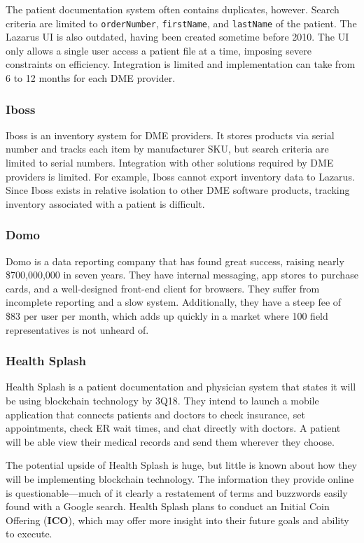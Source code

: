 \documentclass[letterpaper]{article}
\begin{document}
  The patient documentation system often contains duplicates, however. Search criteria are limited to \texttt{orderNumber}, \texttt{firstName}, and \texttt{lastName} of the patient. The Lazarus UI is also outdated, having been created sometime before 2010. The UI only allows a single user access a patient file at a time, imposing severe constraints on efficiency. Integration is limited and implementation can take from 6 to 12 months for each DME provider.%

  \subsubsection{Iboss}
  Iboss is an inventory system for DME providers. It stores products via serial number and tracks each item by manufacturer SKU, but search criteria are limited to serial numbers. Integration with other solutions required by DME providers is limited. For example, Iboss cannot export inventory data to Lazarus. Since Iboss exists in relative isolation to other DME software products, tracking inventory associated with a patient is difficult.%

  \subsubsection{Domo}
  Domo is a data reporting company that has found great success, raising nearly \$700,000,000 in seven years. They have internal messaging, app stores to purchase cards, and a well-designed front-end client for browsers. They suffer from incomplete reporting and a slow system. Additionally, they have a steep fee of \$83 per user per month, which adds up quickly in a market where 100 field representatives is not unheard of.%

  \subsubsection{Health Splash}
  Health Splash is a patient documentation and physician system that states it will be using blockchain technology by 3Q18. They intend to launch a mobile application that connects patients and doctors to check insurance, set appointments, check ER wait times, and chat directly with doctors. A patient will be able view their medical records and send them wherever they choose.%

  The potential upside of Health Splash is huge, but little is known about how they will be implementing blockchain technology. The information they provide online is questionable---much of it clearly a restatement of terms and buzzwords easily found with a Google search. Health Splash plans to conduct an Initial Coin Offering (\textbf{ICO}), which may offer more insight into their future goals and ability to execute.%
\end{document}
